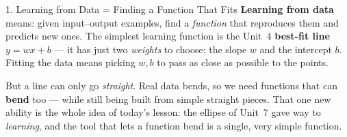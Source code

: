 \documentclass[10pt]{article}
\begin{document}
\begin{notesbox}{1. Learning from Data = Finding a Function That Fits}
\textbf{Learning from data} means: given input--output examples, find a \emph{function} that reproduces
them and predicts new ones. The simplest learning function is the Unit~4 \textbf{best-fit line}
$y=wx+b$ --- it has just two \emph{weights} to choose: the slope $w$ and the intercept $b$. Fitting the
data means picking $w,b$ to pass as close as possible to the points.

\vspace{2pt}
But a line can only go \emph{straight}. Real data bends, so we need functions that can \textbf{bend} too
--- while still being built from simple straight pieces. That one new ability is the whole idea of
today's lesson: the ellipse of Unit~7 gave way to \emph{learning}, and the tool that lets a function
bend is a single, very simple function.
\end{notesbox}
\end{document}
